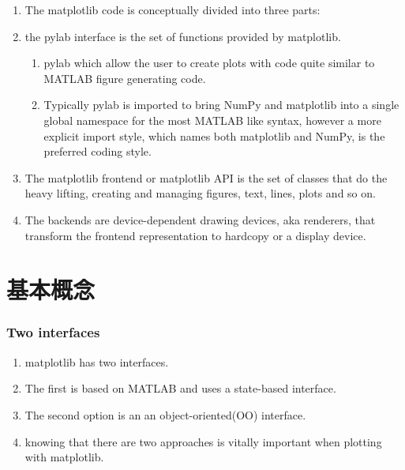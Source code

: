 \documentclass[UTF8,a4paper,12pt]{ctexart}  %
\providecommand{\tightlist}{\setlength{\itemsep}{0pt}\setlength{\parskip}{0pt}}
\begin{document}
\begin{enumerate}
\def\labelenumi{\arabic{enumi}.}
\item
  The matplotlib code is conceptually divided into three parts:
\item
  the pylab interface is the set of functions provided by matplotlib.

  \begin{enumerate}
  \def\labelenumii{\arabic{enumii}.}
  \tightlist
  \item
    pylab which allow the user to create plots with code quite
    similar to MATLAB figure generating code.
  \item
    Typically pylab is imported to bring NumPy and matplotlib into a
    single global namespace for the most MATLAB like syntax, however
    a more explicit import style, which names both matplotlib and
    NumPy, is the preferred coding style.
  \end{enumerate}
\item
  The matplotlib frontend or matplotlib API is the set of classes that
  do the heavy lifting, creating and managing figures, text, lines,
  plots and so on.
\item
  The backends are device-dependent drawing devices, aka renderers,
  that transform the frontend representation to hardcopy or a display
  device.
\end{enumerate}

\hypertarget{ux57faux672cux6982ux5ff5}{%
\section{基本概念}\label{ux57faux672cux6982ux5ff5}}

\hypertarget{two-interfaces}{%
\subsubsection{Two interfaces}\label{two-interfaces}}

\begin{enumerate}
\def\labelenumi{\arabic{enumi}.}
\tightlist
\item
  matplotlib has two interfaces.
\item
  The first is based on MATLAB and uses a state-based interface.
\item
  The second option is an an object-oriented(OO) interface.
\item
  knowing that there are two approaches is vitally important when
  plotting with matplotlib.
\end{enumerate}
\end{document}
